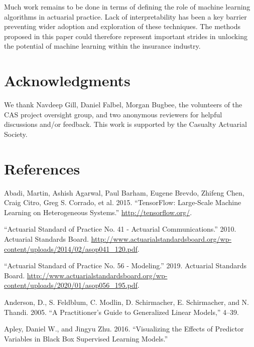 \documentclass[preprint, 3p, twocolumn, letterpaper, 10pt]{elsarticle} %
\begin{document}
Much work remains to be done in terms of defining the role of machine learning
algorithms in actuarial practice. Lack of interpretability has been a key
barrier preventing wider adoption and exploration of these techniques. The
methods proposed in this paper could therefore represent important strides in
unlocking the potential of machine learning within the insurance industry.

\hypertarget{acknowledgments}{%
\section*{Acknowledgments}\label{acknowledgments}}

We thank Navdeep Gill, Daniel Falbel, Morgan Bugbee, the volunteers of the CAS
project oversight group, and two anonymous reviewers for helpful discussions
and/or feedback.
This work is supported by the Casualty Actuarial Society.

\hypertarget{references}{%
\section*{References}\label{references}}

\hypertarget{refs}{}
\leavevmode\hypertarget{ref-tensorflow2015-whitepaper}{}%
Abadi, Martin, Ashish Agarwal, Paul Barham, Eugene Brevdo, Zhifeng Chen, Craig Citro, Greg S. Corrado, et al. 2015. ``TensorFlow: Large-Scale Machine Learning on Heterogeneous Systems.'' \url{http://tensorflow.org/}.

\leavevmode\hypertarget{ref-asop_41}{}%
``Actuarial Standard of Practice No. 41 - Actuarial Communications.'' 2010. Actuarial Standards Board. \url{http://www.actuarialstandardsboard.org/wp-content/uploads/2014/02/asop041_120.pdf}.

\leavevmode\hypertarget{ref-asop_56}{}%
``Actuarial Standard of Practice No. 56 - Modeling.'' 2019. Actuarial Standards Board. \url{http://www.actuarialstandardsboard.org/wp-content/uploads/2020/01/asop056_195.pdf}.

\leavevmode\hypertarget{ref-anderson_2005}{}%
Anderson, D., S. Feldblum, C. Modlin, D. Schirmacher, E. Schirmacher, and N. Thandi. 2005. ``A Practitioner's Guide to Generalized Linear Models,'' 4--39.

\leavevmode\hypertarget{ref-apley2016visualizing}{}%
Apley, Daniel W., and Jingyu Zhu. 2016. ``Visualizing the Effects of Predictor Variables in Black Box Supervised Learning Models.''
\end{document}
